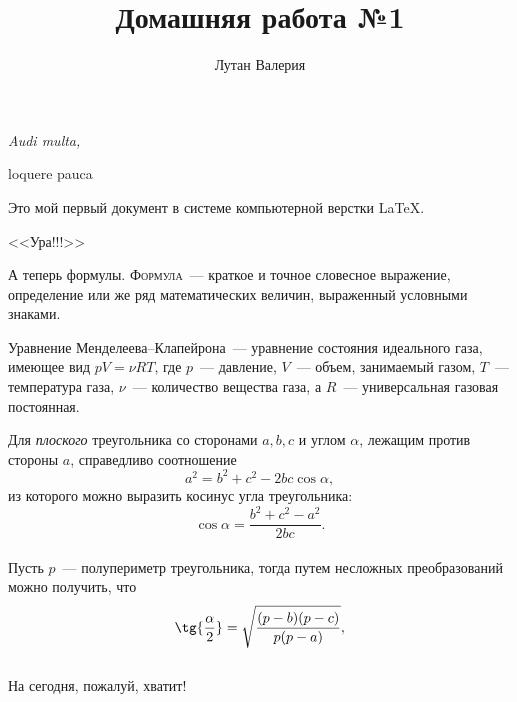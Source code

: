 \documentclass{article}
\title{Домашняя работа №1}
\author{Лутан Валерия}
\date{}
\begin{document}
\maketitle

\begin{flushright}
{\small \itshape Audi multa,

loquere pauca}
\end{flushright}
\vspace{20pt}

Это мой первый документ в системе компьютерной верстки \LaTeX . \\

\begin{center}
{\huge \sffamily <<Ура!!!>>}\\
\end{center}

А теперь формулы. {\scshape Формула}~--- краткое и точное словесное выражение, определение или же ряд математических величин, выраженный условными знаками.

\vspace{15pt}
\hspace{28pt}{\Large \bfseries Термодинамика}

Уравнение Менделеева--Клапейрона~--- уравнение состояния идеального газа, имеющее вид $pV = \nu RT$, где $p$~--- давление, $V$~--- объем, занимаемый газом, $T$~--- температура газа, $\nu$~--- количество вещества газа, а $R$~--- универсальная газовая постоянная.

\vspace{15pt}
\hspace{28pt}{\Large \bfseries Геометрия \hfill Планиметрия}

Для {\slshape плоского} треугольника со сторонами $a, b, c$ и углом $\alpha$, лежащим против стороны $a$, справедливо соотношение $$a^2 = b^2 + c^2 - 2bc\cos{\alpha},$$ из которого можно выразить косинус угла треугольника: $$\cos{\alpha} = \frac{b^2 + c^2 - a^2}{2bc}.$$ \\

Пусть $p$~--- полупериметр треугольника, тогда путем несложных преобразований можно получить, что $$ \tg{\frac{\alpha}{2}}= \sqrt{\frac{(p - b)(p - c)}{p(p - a)}},$$\\
\vspace{1cm}
На сегодня, пожалуй, хватит!
\end{document}
